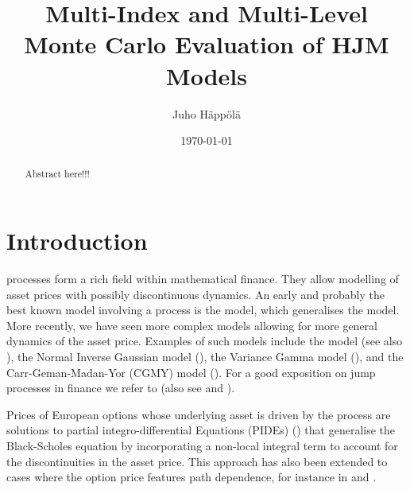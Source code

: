 \documentclass[11pt]{amsart}
\title[MIMC and MLMC HJM]{Multi-Index and Multi-Level Monte Carlo Evaluation of HJM Models}
\author{Juho H\"app\"ol\"a}
\date{\today}
\begin{document}
\begin{abstract}
Abstract here!!!
\end{abstract}

\maketitle


\section{Introduction}
\label{section:Introduction}


\levy processes form a rich field within mathematical
finance. They allow modelling of asset prices with possibly discontinuous dynamics. An early and probably the best known model involving
a \levy process is
the \cite{Merton1976125} model, which generalises the \cite{black1973pricing} model. More recently, we have seen more complex models allowing
for more general dynamics of the asset price. Examples of such models include
the \cite{kou2002jump} model (see also \cite{Dotsis20073584}), the Normal Inverse Gaussian
model (\cite{barndorff1997normal, rydberg1997normal}),
the Variance Gamma model (\cite{madan1990variance, madan1998variance}),
and the Carr-Geman-Madan-Yor (CGMY) model
(\cite{cgmy_fine,carr2003stochastic}). For a good exposition on jump processes in finance we refer to \cite{conttankov}
(also see \cite{raible2000levy} and \cite{eberlein2001application}).

Prices of European options whose underlying asset is driven
by the \levy process are solutions to partial integro-differential
Equations (PIDEs) (\cite{nualart2001backward,briani_chioma_natalini,almendral2005numerical,kiessling2011diffusion})
that generalise
the Black-Scholes equation by incorporating a
non-local integral term to account for the discontinuities in
the asset price. This approach has also been extended to
cases where the option price features path dependence,
for instance in \cite{boyarchenko2002barrier} \cite{d2004penalty} and \cite{lord2008fast}.
\end{document}
